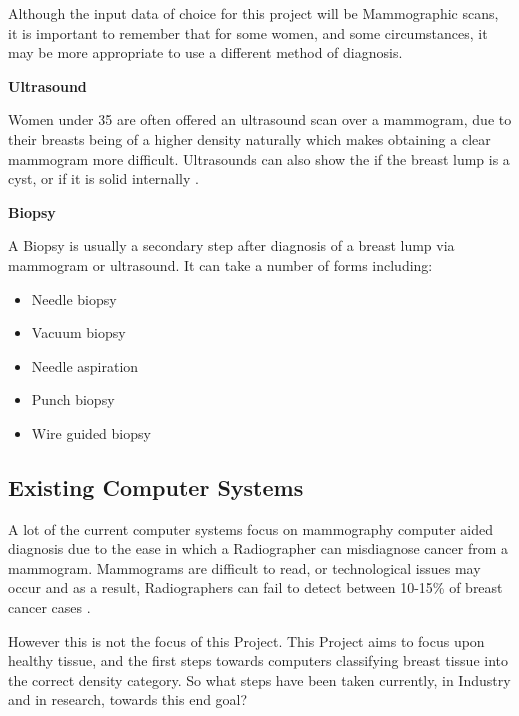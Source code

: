 Although the input data of choice for this project will be Mammographic scans, it is important to remember that for some women, and some circumstances, it may be more appropriate to use a different method of diagnosis.

\textbf{Ultrasound}

Women under 35 are often offered an ultrasound scan over a mammogram, due to their breasts being of a higher density naturally which makes obtaining a clear mammogram more difficult. Ultrasounds can also show the if the breast lump is a cyst, or if it is solid internally \cite{Cancer_Research_UK_2015}.

\noindent \textbf{Biopsy}

A Biopsy is usually a secondary step after diagnosis of a breast lump via mammogram or ultrasound. It can take a number of forms including:

\begin{itemize}
  \item Needle biopsy
  \item Vacuum biopsy
  \item Needle aspiration
  \item Punch biopsy
  \item Wire guided biopsy
\end{itemize}


\subsection{Existing Computer Systems}

A lot of the current computer systems focus on mammography computer aided diagnosis due to the ease in which a Radiographer can misdiagnose cancer from a mammogram. Mammograms are difficult to read, or technological issues may occur and as a result, Radiographers can fail to detect between 10-15\% of breast cancer cases \cite{Champaign_Cederbom_2000}.

However this is not the focus of this Project. This Project aims to focus upon healthy tissue, and the first steps towards computers classifying breast tissue into the correct density category. So what steps have been taken currently, in Industry and in research, towards this end goal?

